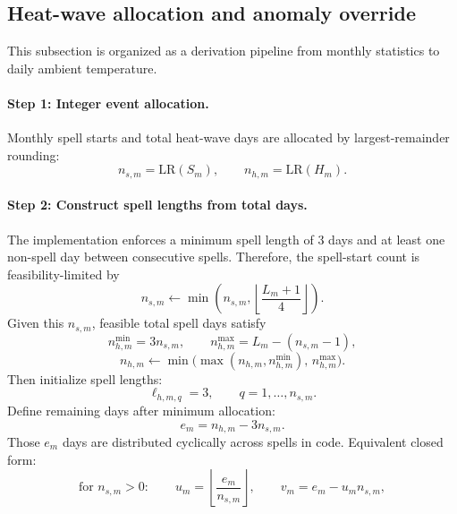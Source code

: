 \documentclass[11pt]{article}
\begin{document}
\subsection{Heat-wave allocation and anomaly override}
This subsection is organized as a derivation pipeline from monthly statistics to daily ambient temperature.

\paragraph{Step 1: Integer event allocation.}
Monthly spell starts and total heat-wave days are allocated by largest-remainder rounding:
\begin{equation}
\label{eq:heatwave_alloc}
n_{s,m}=\mathrm{LR}(S_m),
\qquad
n_{h,m}=\mathrm{LR}(H_m).
\end{equation}
\paragraph{Step 2: Construct spell lengths from total days.}
The implementation enforces a minimum spell length of 3 days and at least one non-spell day between consecutive spells.
Therefore, the spell-start count is feasibility-limited by
\begin{equation}
\label{eq:heatwave_spell_count_cap}
n_{s,m}\leftarrow \min\!\left(n_{s,m},\left\lfloor\frac{L_m+1}{4}\right\rfloor\right).
\end{equation}
Given this \(n_{s,m}\), feasible total spell days satisfy
\begin{equation}
\label{eq:heatwave_total_days_bounds}
n_{h,m}^{\min}=3n_{s,m},
\qquad
n_{h,m}^{\max}=L_m-(n_{s,m}-1),
\end{equation}
\begin{equation}
\label{eq:heatwave_total_days_clip}
n_{h,m}\leftarrow \min\!\big(\max(n_{h,m},n_{h,m}^{\min}),\,n_{h,m}^{\max}\big).
\end{equation}
Then initialize spell lengths:
\begin{equation}
\label{eq:heatwave_lengths_init}
\ell_{h,m,q}=3,\qquad q=1,\dots,n_{s,m}.
\end{equation}
Define remaining days after minimum allocation:
\begin{equation}
\label{eq:heatwave_lengths_total}
e_m=n_{h,m}-3n_{s,m}.
\end{equation}
Those \(e_m\) days are distributed cyclically across spells in code. Equivalent closed form:
\begin{equation}
\label{eq:heatwave_lengths_qr}
\text{for }n_{s,m}>0:\qquad
u_m=\left\lfloor\frac{e_m}{n_{s,m}}\right\rfloor,\qquad
v_m=e_m-u_m n_{s,m},
\end{equation}
\end{document}
